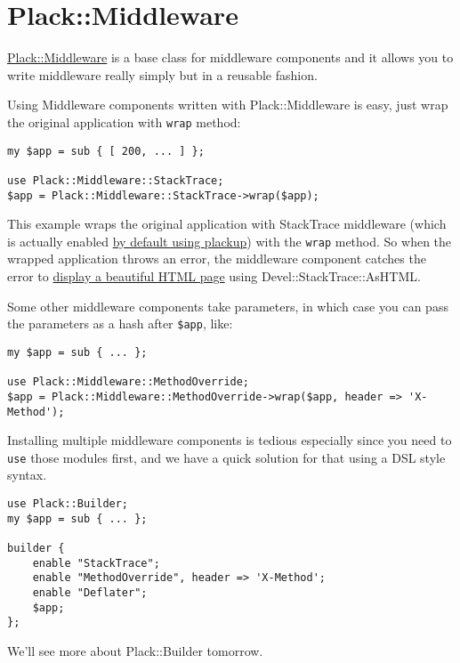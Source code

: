 \section{Plack::Middleware}\label{plackmiddleware}

\href{http://search.cpan.org/perldoc?Plack::Middleware}{Plack::Middleware}
is a base class for middleware components and it allows you to write
middleware really simply but in a reusable fashion.

Using Middleware components written with Plack::Middleware is easy, just
wrap the original application with \lstinline!wrap! method:

\begin{lstlisting}
my $app = sub { [ 200, ... ] };

use Plack::Middleware::StackTrace;
$app = Plack::Middleware::StackTrace->wrap($app);
\end{lstlisting}

This example wraps the original application with StackTrace middleware
(which is actually enabled
\href{http://advent.plackperl.org/2009/12/day-3-using-plackup.html}{by
default using plackup}) with the \lstinline!wrap! method. So when the
wrapped application throws an error, the middleware component catches
the error to
\href{http://bulknews.typepad.com/blog/2009/10/develstacktraceashtml.html}{display
a beautiful HTML page} using Devel::StackTrace::AsHTML.

Some other middleware components take parameters, in which case you can
pass the parameters as a hash after \lstinline!$app!, like:

\begin{lstlisting}
my $app = sub { ... };

use Plack::Middleware::MethodOverride;
$app = Plack::Middleware::MethodOverride->wrap($app, header => 'X-Method');
\end{lstlisting}

Installing multiple middleware components is tedious especially since
you need to \lstinline!use! those modules first, and we have a quick
solution for that using a DSL style syntax.

\begin{lstlisting}
use Plack::Builder;
my $app = sub { ... };

builder {
    enable "StackTrace";
    enable "MethodOverride", header => 'X-Method';
    enable "Deflater";
    $app;
};
\end{lstlisting}

We'll see more about Plack::Builder tomorrow.

